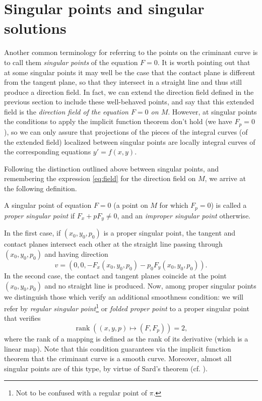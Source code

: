 \section{Singular points and singular solutions}

Another common terminology for referring to the points on the criminant curve is to call them \textit{singular points} of the equation $F=0$. It is worth pointing out that at some singular points it may well be the case that the contact plane is different from the tangent plane, so that they intersect in a straight line and thus still produce a direction field. In fact, we can extend the direction field defined in the previous section to include these well-behaved points, and say that this extended field is the \textit{direction field of the equation $F=0$ on $M$}. However, at singular points the conditions to apply the implicit function theorem don't hold (we have $F_p=0$), so we can only assure that projections of the pieces of the integral curves (of the extended field) localized between singular points are locally integral curves of the corresponding equations $y'=f(x,y)$.

Following the distinction outlined above between singular points, and remembering the expression \eqref{eq:field} for the direction field on $M$, we arrive at the following definition.

\begin{definition}
  A singular point of equation $F=0$ (a point on $M$ for which $F_p=0$) is called a \textit{proper singular point} if $F_x+pF_y \neq 0$, and an \textit{improper singular point} otherwise.
\end{definition}
In the first case, if $(x_0,y_0,p_0)$ is a proper singular point, the tangent and contact planes intersect each other at the straight line passing through $(x_0,y_0,p_0)$ and having direction
\[
v=(0,0,-F_x(x_0,y_0,p_0)-p_0F_y(x_0,y_0,p_0)).
\]
In the second case, the contact and tangent planes coincide at the point $(x_0,y_0,p_0)$ and no straight line is produced. Now, among proper singular points we distinguish those which verify an additional smoothness condition: we will refer by \textit{regular singular point}\footnote{Not to be confused with a regular point of $\pi$.} or \textit{folded proper point} to a proper singular point that verifies
\[
\operatorname{rank}((x,y,p) \mapsto (F,F_p)) = 2,
\]
where the rank of a mapping is defined as the rank of its derivative (which is a linear map). Note that this condition guarantees via the implicit function theorem that the criminant curve is a smooth curve. Moreover, almost all singular points are of this type, by virtue of Sard's theorem (cf. \cite[94]{arnold2012geometrical}).

